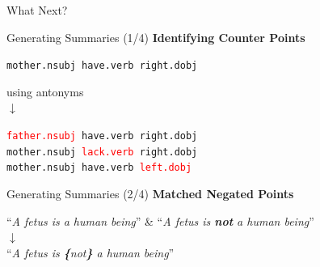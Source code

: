 \documentclass{beamer}
\begin{document}
  \begin{frame}{What Next?}
  \end{frame}

  \begin{frame}{Generating Summaries (1/4)}
    \textbf{Identifying Counter Points}

    \texttt{mother.nsubj have.verb right.dobj}\\
    \begin{center}
      using antonyms\\$\downarrow$
    \end{center}
    \texttt{\textcolor{red}{father.nsubj} have.verb right.dobj}\\
    \texttt{mother.nsubj \textcolor{red}{lack.verb} right.dobj}\\
    \texttt{mother.nsubj have.verb \textcolor{red}{left.dobj}}
  \end{frame}

  \begin{frame}{Generating Summaries (2/4)}
    \textbf{Matched Negated Points}

    \begin{center}
      ``\textit{A fetus is a human being}''
      \&
      ``\textit{A fetus is \textbf{not} a human being}''\\
      $\downarrow$ \\
      ``\textit{A fetus is \textbf{\{}not\textbf{\}} a human being}''
    \end{center}
  \end{frame}
\end{document}
